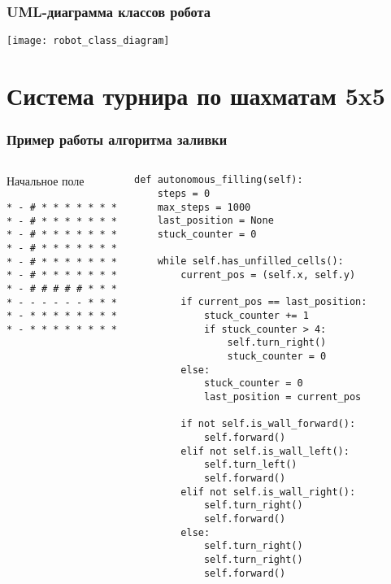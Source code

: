 \documentclass[14pt]{beamer}
\begin{document}
\begin{frame}
\frametitle{UML-диаграмма классов робота}
\begin{center}
\texttt{[image: robot\_class\_diagram]}
\end{center}
\end{frame}

\section{Система турнира по шахматам 5x5}

\begin{frame}[fragile]
\frametitle{Пример работы алгоритма заливки}
\begin{columns}
\begin{block}{Начальное поле}
\begin{verbatim}
* - # * * * * * * *
* - # * * * * * * *
* - # * * * * * * *
* - # * * * * * * *
* - # * * * * * * *
* - # * * * * * * *
* - # # # # # * * *
* - - - - - - * * *
* - * * * * * * * *
* - * * * * * * * *
\end{verbatim}
\end{block}

\begin{lstlisting}[basicstyle=\tiny]
def autonomous_filling(self):
    steps = 0
    max_steps = 1000
    last_position = None
    stuck_counter = 0
    
    while self.has_unfilled_cells():
        current_pos = (self.x, self.y)
        
        if current_pos == last_position:
            stuck_counter += 1
            if stuck_counter > 4:
                self.turn_right()
                stuck_counter = 0
        else:
            stuck_counter = 0
            last_position = current_pos
        
        if not self.is_wall_forward():
            self.forward()
        elif not self.is_wall_left():
            self.turn_left()
            self.forward()
        elif not self.is_wall_right():
            self.turn_right()
            self.forward()
        else:
            self.turn_right()
            self.turn_right()
            self.forward()
\end{lstlisting}
\end{columns}
\end{frame}
\end{document}
